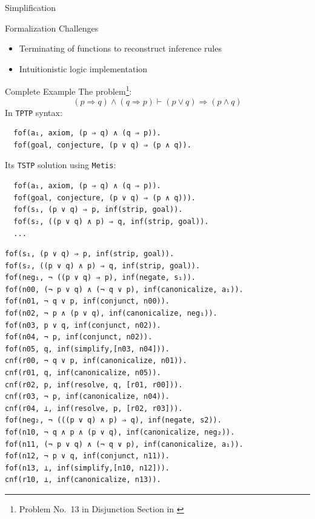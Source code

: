 \documentclass[10pt, xetex, hyperref={pdfpagelabels=false}]{beamer}
\newcommand{\prg}[1]{\texttt{#1}\xspace}
\newcommand{\Metis}{\prg{Metis}}
\newcommand{\len}[1]{\texttt{#1}\xspace}
\newcommand{\TPTP}{\len{TPTP}}
\newcommand{\TSTP}{\len{TSTP}}
\begin{document}
\begin{frame}{Simplification}
\end{frame}

\begin{frame}{Formalization Challenges}
\begin{itemize}
  \item Terminating of functions to reconstruct inference rules
  \item Intuitionistic logic implementation
\end{itemize}
\end{frame}

\begin{frame}[fragile]{Complete Example}
The problem\footnote{Problem No.~13 in Disjunction Section in \cite{Prieto-Cubides2017}}:
\begin{equation*}
(p \Rightarrow q) \wedge (q \Rightarrow p) ⊢ (p \vee q) \Rightarrow (p \wedge q)
\end{equation*}
In \TPTP syntax:
\begin{verbatim}
  fof(a₁, axiom, (p ⇒ q) ∧ (q ⇒ p)).
  fof(goal, conjecture, (p ∨ q) ⇒ (p ∧ q)).
\end{verbatim}
Its \TSTP solution using \Metis:
\begin{verbatim}
  fof(a₁, axiom, (p ⇒ q) ∧ (q ⇒ p)).
  fof(goal, conjecture, (p ∨ q) ⇒ (p ∧ q))).
  fof(s₁, (p ∨ q) ⇒ p, inf(strip, goal)).
  fof(s₂, ((p ∨ q) ∧ p) ⇒ q, inf(strip, goal)).
  ...
\end{verbatim}
\end{frame}

\begin{frame}
\begin{verbatim}
fof(s₁, (p ∨ q) ⇒ p, inf(strip, goal)).
fof(s₂, ((p ∨ q) ∧ p) ⇒ q, inf(strip, goal)).
fof(neg₁, ¬ ((p ∨ q) ⇒ p), inf(negate, s₁)).
fof(n00, (¬ p ∨ q) ∧ (¬ q ∨ p), inf(canonicalize, a₁)).
fof(n01, ¬ q ∨ p, inf(conjunct, n00)).
fof(n02, ¬ p ∧ (p ∨ q), inf(canonicalize, neg₁)).
fof(n03, p ∨ q, inf(conjunct, n02)).
fof(n04, ¬ p, inf(conjunct, n02)).
fof(n05, q, inf(simplify,[n03, n04])).
cnf(r00, ¬ q ∨ p, inf(canonicalize, n01)).
cnf(r01, q, inf(canonicalize, n05)).
cnf(r02, p, inf(resolve, q, [r01, r00])).
cnf(r03, ¬ p, inf(canonicalize, n04)).
cnf(r04, ⊥, inf(resolve, p, [r02, r03])).
fof(neg₂, ¬ (((p ∨ q) ∧ p) ⇒ q), inf(negate, s2)).
fof(n10, ¬ q ∧ p ∧ (p ∨ q), inf(canonicalize, neg₂)).
fof(n11, (¬ p ∨ q) ∧ (¬ q ∨ p), inf(canonicalize, a₁)).
fof(n12, ¬ p ∨ q, inf(conjunct, n11)).
fof(n13, ⊥, inf(simplify,[n10, n12])).
cnf(r10, ⊥, inf(canonicalize, n13)).
\end{verbatim}
\end{frame}
\end{document}
